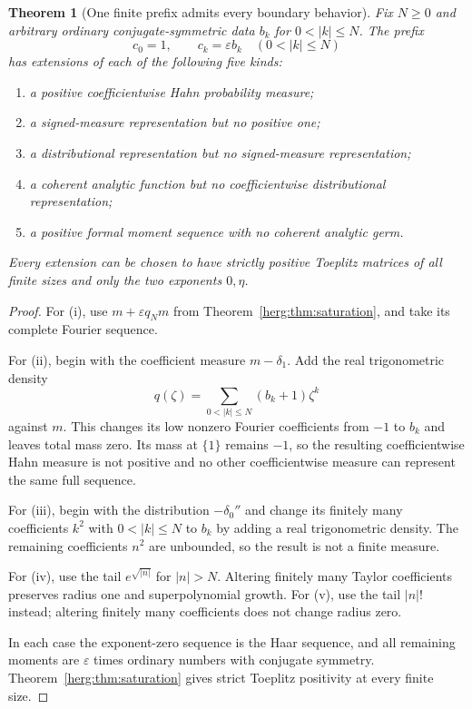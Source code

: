 \documentclass[11pt,letterpaper]{article}
\newtheorem{theorem}{Theorem}[section]
\theoremstyle{definition}
\newcommand{\eps}{\varepsilon}
\numberwithin{equation}{section}
\begin{document}
\begin{theorem}[One finite prefix admits every boundary behavior]\label{herg:thm:prefix}
Fix $N\ge0$ and arbitrary ordinary conjugate-symmetric data $b_k$ for $0<|k|\le N$. The prefix
\[
 c_0=1,\qquad c_k=\eps b_k\quad(0<|k|\le N)
\]
has extensions of each of the following five kinds:
\begin{enumerate}[label=(\roman*)]
\item a positive coefficientwise Hahn probability measure;
\item a signed-measure representation but no positive one;
\item a distributional representation but no signed-measure representation;
\item a coherent analytic function but no coefficientwise distributional representation;
\item a positive formal moment sequence with no coherent analytic germ.
\end{enumerate}
Every extension can be chosen to have strictly positive Toeplitz matrices of all finite sizes and only the two exponents $0,\eta$.
\end{theorem}
\begin{proof}
For (i), use $m+\eps q_Nm$ from Theorem~\ref{herg:thm:saturation}, and take its complete Fourier sequence.

For (ii), begin with the coefficient measure $m-\delta_1$. Add the real trigonometric density
\[
 q(\zeta)=\sum_{0<|k|\le N}(b_k+1)\zeta^k
\]
against $m$. This changes its low nonzero Fourier coefficients from $-1$ to $b_k$ and leaves total mass zero. Its mass at $\{1\}$ remains $-1$, so the resulting coefficientwise Hahn measure is not positive and no other coefficientwise measure can represent the same full sequence.

For (iii), begin with the distribution $-\delta_0''$ and change its finitely many coefficients $k^2$ with $0<|k|\le N$ to $b_k$ by adding a real trigonometric density. The remaining coefficients $n^2$ are unbounded, so the result is not a finite measure.

For (iv), use the tail $e^{\sqrt{|n|}}$ for $|n|>N$. Altering finitely many Taylor coefficients preserves radius one and superpolynomial growth. For (v), use the tail $|n|!$ instead; altering finitely many coefficients does not change radius zero.

In each case the exponent-zero sequence is the Haar sequence, and all remaining moments are $\eps$ times ordinary numbers with conjugate symmetry. Theorem~\ref{herg:thm:saturation} gives strict Toeplitz positivity at every finite size.
\end{proof}
\end{document}
